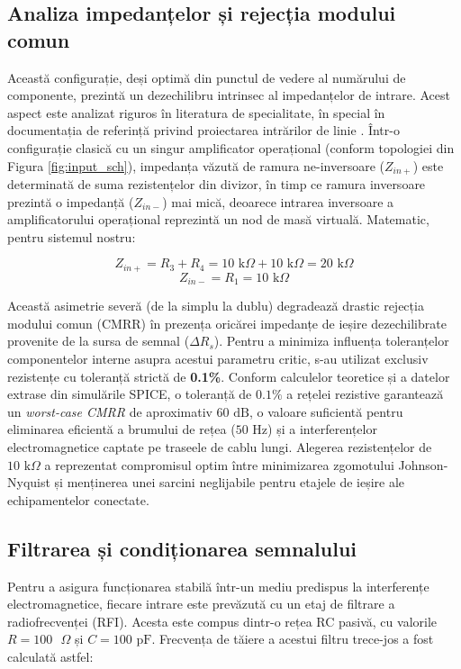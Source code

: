 \subsection{Analiza impedanțelor și rejecția modului comun}
Această configurație, deși optimă din punctul de vedere al numărului de componente, prezintă un dezechilibru intrinsec al impedanțelor de intrare. Acest aspect este analizat riguros în literatura de specialitate, în special în documentația de referință privind proiectarea intrărilor de linie \cite[Capitolul \textit{Line Inputs}]{douglasself}. Într-o configurație clasică cu un singur amplificator operațional (conform topologiei din Figura \ref{fig:input_sch}), impedanța văzută de ramura ne-inversoare ($Z_{in+}$) este determinată de suma rezistențelor din divizor, în timp ce ramura inversoare prezintă o impedanță ($Z_{in-}$) mai mică, deoarece intrarea inversoare a amplificatorului operațional reprezintă un nod de masă virtuală. Matematic, pentru sistemul nostru:

\begin{equation}
    Z_{in+} = R_3 + R_4 = 10\text{ k}\Omega + 10\text{ k}\Omega = 20\text{ k}\Omega
\end{equation}
\begin{equation}
    Z_{in-} = R_1 = 10\text{ k}\Omega
\end{equation}

Această asimetrie severă (de la simplu la dublu) degradează drastic rejecția modului comun (CMRR) în prezența oricărei impedanțe de ieșire dezechilibrate provenite de la sursa de semnal ($\Delta R_s$). Pentru a minimiza influența toleranțelor componentelor interne asupra acestui parametru critic, s-au utilizat exclusiv rezistențe cu toleranță strictă de \textbf{0.1\%}. Conform calculelor teoretice și a datelor extrase din simulările SPICE, o toleranță de $0.1\%$ a rețelei rezistive garantează un \textit{worst-case CMRR} de aproximativ $60\text{ dB}$, o valoare suficientă pentru eliminarea eficientă a brumului de rețea ($50\text{ Hz}$) și a interferențelor electromagnetice captate pe traseele de cablu lungi. Alegerea rezistențelor de $10\text{ k}\Omega$ a reprezentat compromisul optim între minimizarea zgomotului Johnson-Nyquist și menținerea unei sarcini neglijabile pentru etajele de ieșire ale echipamentelor conectate.

\subsection{Filtrarea și condiționarea semnalului}
Pentru a asigura funcționarea stabilă într-un mediu predispus la interferențe electromagnetice, fiecare intrare este prevăzută cu un etaj de filtrare a radiofrecvenței (RFI). Acesta este compus dintr-o rețea RC pasivă, cu valorile $R = 100\text{ }\Omega$ și $C = 100\text{ pF}$. Frecvența de tăiere a acestui filtru trece-jos a fost calculată astfel:

